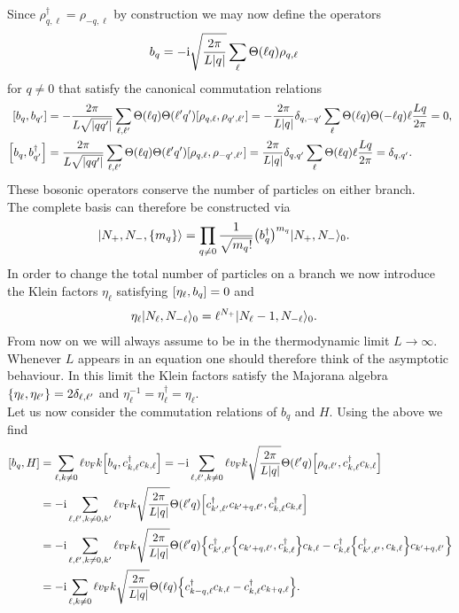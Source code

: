 \documentclass[english, parskip=full]{scrartcl}
\begin{document}
Since $\rho_{q,\ell}^\dagger = \rho_{-q,\ell}$ by construction we may now define the operators
\begin{align}
b_q &= -\i \sqrt{\frac{2\pi}{L|q|}} \sum_\ell \Theta(\ell q) \rho_{q,\ell}
\end{align}
for $q\neq 0$ that satisfy the canonical commutation relations
\begin{align}
\klb*{b_q, b_{q'}} &= -\frac{2\pi}{L\sqrt{|qq'|}} \sum_{\ell,\ell'} \Theta(\ell q)\Theta(\ell' q') \klb*{\rho_{q,\ell}, \rho_{q',\ell'}} = -\frac{2\pi}{L|q|} \delta_{q,-q'} \sum_{\ell} \Theta(\ell q)\Theta(-\ell q) \ell \frac{Lq}{2\pi} = 0,\\
\klb*{b_q, b_{q'}^\dagger} &= \frac{2\pi}{L\sqrt{|qq'|}} \sum_{\ell,\ell'} \Theta(\ell q)\Theta(\ell' q') \klb*{\rho_{q,\ell}, \rho_{-q',\ell'}} = \frac{2\pi}{L|q|} \delta_{q,q'} \sum_{\ell} \Theta(\ell q) \ell \frac{Lq}{2\pi} = \delta_{q,q'}.
\end{align}
These bosonic operators conserve the number of particles on either branch.
\\
The complete basis can therefore be constructed via
\begin{align}
\Ket{N_+,N_-,\klc*{m_q}} &= \prod_{q\neq 0} \frac{1}{\sqrt{m_q!}} \kla*{b_q^\dagger}^{m_q} \Ket{N_+,N_-}_0.
\end{align}
In order to change the total number of particles on a branch we now introduce the Klein factors $\eta_\ell$ satisfying $\klb*{\eta_\ell, b_q} = 0$ and 
\begin{align}
\eta_\ell \Ket{N_\ell, N_{-\ell}}_0 &= \ell^{N_+} \Ket{N_\ell - 1, N_{-\ell}}_0.
\end{align}
From now on we will always assume to be in the thermodynamic limit $L\rightarrow \infty$.
Whenever $L$ appears in an equation one should therefore think of the asymptotic behaviour.
In this limit the Klein factors satisfy the Majorana algebra $\klc*{\eta_\ell, \eta_{\ell'}} = 2\delta_{\ell,\ell'}$ and $\eta_\ell^{-1} = \eta_\ell^\dagger = \eta_\ell$.
\\
Let us now consider the commutation relations of $b_q$ and $H$.
Using the above we find
\begin{align}
\klb*{b_q, H} &= \sum_{\ell,k\neq 0} \ell \vf k \klb*{b_q, c_{k,\ell}^\dagger c_{k,\ell}} = -\i\sum_{\ell,\ell',k\neq 0} \ell \vf k \sqrt{\frac{2\pi}{L|q|}} \Theta(\ell' q) \klb*{\rho_{q,\ell'}, c_{k,\ell}^\dagger c_{k,\ell}} \\
&= -\i\sum_{\ell,\ell',k\neq 0, k'} \ell \vf k \sqrt{\frac{2\pi}{L|q|}} \Theta(\ell' q) \klb*{c_{k',\ell'}^\dagger c_{k'+q,\ell'}, c_{k,\ell}^\dagger c_{k,\ell}}  \\
&= -\i\sum_{\ell,\ell',k\neq 0, k'} \ell \vf k \sqrt{\frac{2\pi}{L|q|}} \Theta(\ell' q) \klc*{c_{k',\ell'}^\dagger \klc*{c_{k'+q,\ell'}, c_{k,\ell}^\dagger} c_{k,\ell} - c_{k,\ell}^\dagger \klc*{c_{k',\ell'}^\dagger , c_{k,\ell}} c_{k'+q,\ell'}}\\
&= -\i\sum_{\ell,k\neq 0} \ell \vf k \sqrt{\frac{2\pi}{L|q|}} \Theta(\ell q) \klc*{c_{k-q,\ell}^\dagger c_{k,\ell} - c_{k,\ell}^\dagger c_{k+q,\ell}}.
\end{align}
\end{document}
